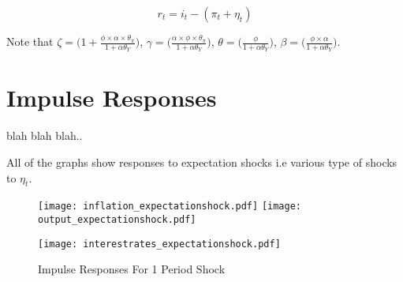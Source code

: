 \documentclass[12pt]{article}
\makeatletter
\newcommand\Taccount[3][3cm]%
{{\renewcommand\arraystretch{1.3}%
		\begin{adjustbox}{width=0.4\textwidth}
		\begin{tabular}[t]{@{}p{#1}|p{#1}@{}}
			\multicolumn{2}{@{}c@{}}{#2}\\
			\hline
			\hline
			#3
		\end{tabular}%
		\end{adjustbox}
	
}}
\newcommand{\1}{\mathbbm 1}
\makeatother
\begin{document}
\begin{equation}
	r_{t} = i_{t} - (\pi_{t} + \eta_{t})
\end{equation}

Note that $\zeta = \bigg(1 +  \frac{\phi \times \alpha \times \theta_{\pi}}{1 + \alpha \theta_{Y}}\bigg)$, $\gamma = \bigg(\frac{\alpha \times \phi \times \theta_{\pi}}{1 + \alpha \theta_{Y}}\bigg)$, $\theta = \bigg(\frac{\phi}{1 + \alpha \theta_{Y}}\bigg)$, $\beta = \bigg(\frac{\phi \times \alpha}{1 + \alpha \theta_{Y}}\bigg)$.














	
		
		
	
		
		\section{Impulse Responses}
		
		blah blah blah..
		
		
		
	All of the graphs show responses to expectation shocks i.e various type of shocks to $\eta_{t}$.
		
		
		
		
		
		
		\begin{figure}[H]
				\texttt{[image: inflation\_expectationshock.pdf]}
				\hfill
				\texttt{[image: output\_expectationshock.pdf]}
				\hfill
				\begin{Center}
				\texttt{[image: interestrates\_expectationshock.pdf]}
				\end{Center}
				\caption{Impulse Responses For 1 Period Shock}
		\end{figure}
		
\end{document}
